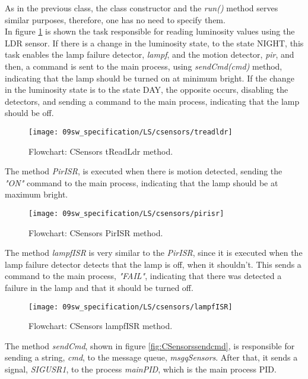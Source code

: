 As in the previous class, the class constructor and the \textit{run()} method serves similar purposes, therefore, one has no need to specify them.\\

In figure \ref{fig:CSensorstreadldr} is shown the task responsible for reading luminosity values using the LDR sensor. If there is a change in the luminosity state, to the state NIGHT, this task enables the lamp failure detector, \textit{lampf}, and the motion detector, \textit{pir}, and then, a command is sent to the main process, using \textit{sendCmd(cmd)} method, indicating that the lamp should be turned on at minimum bright. If the change in the luminosity state is to the state DAY, the opposite occurs, disabling the detectors, and sending a command to the main process, indicating that the lamp should be off.

\begin{figure}[H]
	\centering
	\texttt{[image: 09sw\_specification/LS/csensors/treadldr]}
	\caption{Flowchart: CSensors tReadLdr method.}
	\label{fig:CSensorstreadldr}
\end{figure}

\clearpage
The method \textit{PirISR}, is executed when there is motion detected, sending the \textit{"ON"} command to the main process, indicating that the lamp should be at maximum bright.

\begin{figure}[H]
	\centering
	\texttt{[image: 09sw\_specification/LS/csensors/pirisr]}
	\caption{Flowchart: CSensors PirISR method.}
	\label{fig:CSensorspirisr}
\end{figure}

The method \textit{lampfISR} is very similar to the \textit{PirISR}, since it is executed when the lamp failure detector detects that the lamp is off, when it shouldn't. This sends a command to the main process, \textit{"FAIL"}, indicating that there was detected a failure in the lamp and that it should be turned off.

\begin{figure}[H]
	\centering
	\texttt{[image: 09sw\_specification/LS/csensors/lampfISR]}
	\caption{Flowchart: CSensors lampfISR method.}
	\label{fig:CSensorstreadlampf}
\end{figure}

\clearpage
The method \textit{sendCmd}, shown in figure \ref{fig:CSensorssendcmd}, is responsible for sending a string, \textit{cmd}, to the message queue, \textit{msgqSensors}. After that, it sends a signal, \textit{SIGUSR1}, to the process \textit{mainPID}, which is the main process PID.

